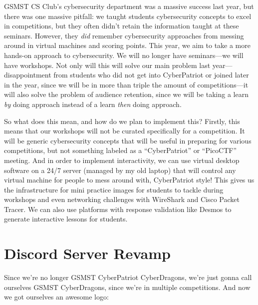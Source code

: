 \documentclass[
  letterpaper,
  DIV=11,
  numbers=noendperiod]{scrartcl}
\begin{document}
GSMST CS Club's cybersecurity department was a massive success last
year, but there was one massive pitfall: we taught students
cybersecurity concepts to excel in competitions, but they often didn't
retain the information taught at these seminars. However, they
\emph{did} remember cybersecurity approaches from messing around in
virtual machines and scoring points. This year, we aim to take a more
hands-on approach to cybersecurity. We will no longer have seminars---we
will have workshops. Not only will this will solve our main problem last
year---disappointment from students who did not get into CyberPatriot or
joined later in the year, since we will be in more than triple the
amount of competitions---it will also solve the problem of audience
retention, since we will be taking a learn \emph{by} doing approach
instead of a learn \emph{then} doing approach.

So what does this mean, and how do we plan to implement this? Firstly,
this means that our workshops will not be curated specifically for a
competition. It will be generic cybersecurity concepts that will be
useful in preparing for various competitions, but not something labeled
as a ``CyberPatriot'' or ``PicoCTF'' meeting. And in order to implement
interactivity, we can use virtual desktop software on a 24/7 server
(managed by my old laptop) that will control any virtual machine for
people to mess around with, CyberPatriot style! This gives us the
infrastructure for mini practice images for students to tackle during
workshops and even networking challenges with WireShark and Cisco Packet
Tracer. We can also use platforms with response validation like Desmos
to generate interactive lessons for students.

\newpage{}

\hypertarget{discord-server-revamp}{%
\section{Discord Server Revamp}\label{discord-server-revamp}}

Since we're no longer GSMST CyberPatriot CyberDragons, we're just gonna
call ourselves GSMST CyberDragons, since we're in multiple competitions.
And now we got ourselves an awesome logo:
\end{document}
